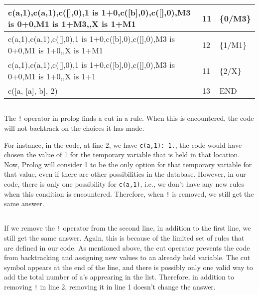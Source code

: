 \documentclass{article}
\begin{document}
\begin{table}[ht!]
\begin{tabular}{|l|l|l|}
c(a,1),c(a,1),c({[}{]},0),1 is 1+0,c({[}b{]},0),c({[}{]},0),M3 is 0+0,M1 is 1+M3,,X is 1+M1     & 11                          & \{0/M3\}                           \\ \hline
c(a,1),c(a,1),c({[}{]},0),1 is 1+0,c({[}b{]},0),c({[}{]},0),M3 is 0+0,M1 is 1+0,,X is 1+M1      & 12                          & \{1/M1\}                           \\ \hline
c(a,1),c(a,1),c({[}{]},0),1 is 1+0,c({[}b{]},0),c({[}{]},0),M3 is 0+0,M1 is 1+0,,X is 1+1       & 11                          & \{2/X\}                            \\ \hline
c({[}a, {[}a{]}, b{]}, 2)                                                                       & 13                          & END                                \\ \hline
\end{tabular}
\end{table}
\subsection{}
The \texttt{!} operator in prolog finds a cut in a rule. When this is encountered, the code will not backtrack on the choices it has made. 

For instance, in the code, at line 2, we have \texttt{c(a,1):-1.}, the code would have chosen the value of 1 for the temporary variable that is held in that location. Now, Prolog will consider 1 to be the only option for that temporary variable for that value, even if there are other possibilities in the database. However, in our code, there is only one possibility for \texttt{c(a,1)}, i.e., we don't have any new rules when this condition is encountered. Therefore, when \texttt{!} is removed, we still get the same answer.
\subsection{}

If we remove the \texttt{!} operator from the second line, in addition to the first line, we still get the same answer. Again, this is because of the limited set of rules that are defined in our code. As mentioned above, the cut operator prevents the code from backtracking and assigning new values to an already held variable. The cut symbol appears at the end of the line, and there is possibly only one valid way to add the total number of a's apprearing in the list. Therefore, in addition to removing \texttt{!} in line 2, removing it in line 1 doesn't change the answer.
\end{document}
